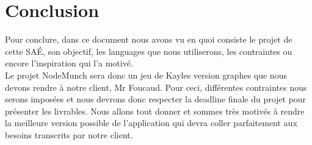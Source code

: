 \documentclass[a4paper, 12pt,table]{report}
\begin{document}
\clearpage

\chapter{Conclusion}
Pour conclure, dans ce document nous avons vu en quoi consiste le projet de cette SAÉ, son objectif, les languages que nous utiliserons, les contraintes ou encore l'inspiration qui l'a motivé. \\
Le projet NodeMunch sera donc un jeu de Kayles version graphes que nous devons rendre à notre client, Mr Foucaud. Pour ceci, différentes contraintes nous serons imposées et nous devrons donc respecter la deadline finale du projet pour présenter les livrables. Nous allons tout donner et sommes très motivés à rendre la meilleure version possible de l'application qui devra coller parfaitement aux besoins transcrits par notre client.
\end{document}
